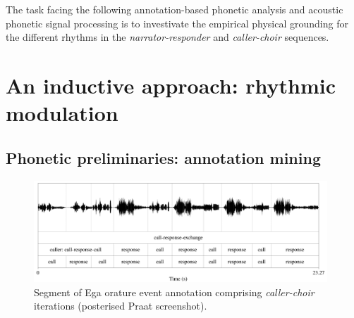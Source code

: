\documentclass[output=paper,colorlinks,citecolor=brown
]{langscibook}
\begin{document}
The task facing the following annotation-based phonetic analysis and acoustic phonetic signal processing is to investivate the empirical physical grounding for the different rhythms in the \textit{narrator-responder} and \textit{caller-choir} sequences.


\section{An inductive approach: rhythmic modulation}

\subsection{Phonetic preliminaries: annotation mining}

\begin{figure}[ht]
\centering
\includegraphics[width=0.98\textwidth]{gibbon_figure04.png}
\caption{\label{fig:fig04}Segment of Ega orature event annotation comprising \textit{caller-choir} iterations (posterised Praat screenshot).}
\end{figure}
\end{document}
